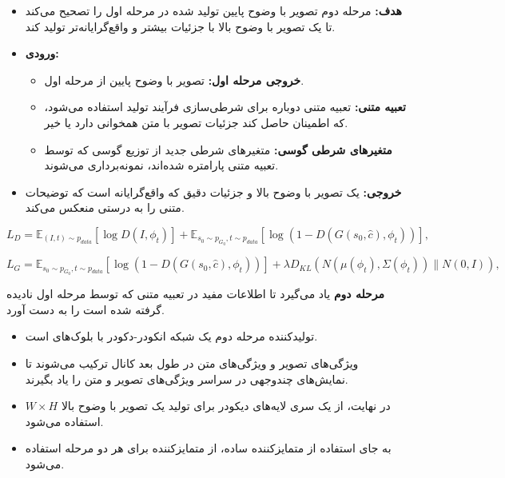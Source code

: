 \begin{enumerate}
\begin{qsolve}
\begin{enumerate}
		\begin{itemize}
			\item \textbf{هدف: }مرحله دوم  تصویر با وضوح پایین تولید شده در مرحله اول را تصحیح می‌کند تا یک تصویر  با وضوح بالا با جزئیات بیشتر و واقع‌گرایانه‌تر تولید کند.
		\end{itemize}
	\end{enumerate}
	\end{qsolve}
	
	
	\begin{qsolve}
		\begin{itemize}
			\item \textbf{ورودی: }
			\begin{itemize}
				\item \textbf{خروجی مرحله اول:} تصویر با وضوح پایین از مرحله اول.
				
				\item \textbf{تعبیه متنی: }تعبیه متنی دوباره برای شرطی‌سازی فرآیند تولید استفاده می‌شود، که اطمینان حاصل کند جزئیات تصویر با متن همخوانی دارد یا خیر.
				
				\item \textbf{متغیرهای شرطی گوسی:} متغیرهای شرطی جدید از توزیع گوسی که توسط تعبیه متنی پارامتره شده‌اند، نمونه‌برداری می‌شوند.
			\end{itemize}
			
			\item \textbf{خروجی: }یک تصویر با وضوح بالا و جزئیات دقیق که واقع‌گرایانه است که توضیحات متنی را به درستی منعکس می‌کند.
		\end{itemize}
		
		
		\begin{equation}
			L_D = \mathbb{E}_{(I,t) \sim p_{data}} [\log D(I, \phi_t)] + \mathbb{E}_{s_0 \sim p_{G_0}, t \sim p_{data}} [\log(1 - D(G(s_0, \hat{c}), \phi_t))],
		\end{equation}
		
		\begin{equation}
			L_G = \mathbb{E}_{s_0 \sim p_{G_0}, t \sim p_{data}} [\log(1 - D(G(s_0, \hat{c}), \phi_t))] + \lambda D_{KL}(N(\mu(\phi_t), \Sigma(\phi_t)) \| N(0, I)),
		\end{equation}
		
		\textbf{مرحله دوم } یاد می‌گیرد تا اطلاعات مفید در تعبیه متنی که توسط مرحله اول \textbf{} نادیده گرفته شده است را به دست آورد.
		
		\begin{itemize}
			\item تولیدکننده مرحله دوم یک شبکه انکودر-دکودر با بلوک‌های  است.
			\item ویژگی‌های تصویر و ویژگی‌های متن در طول بعد کانال ترکیب می‌شوند تا نمایش‌های چندوجهی در سراسر ویژگی‌های تصویر و متن را یاد بگیرند.
			\item در نهایت، از یک سری لایه‌های دیکودر برای تولید یک تصویر با وضوح بالا $W \times H$ استفاده می‌شود.
			\item به جای استفاده از متمایزکننده ساده، از متمایزکننده  برای هر دو مرحله استفاده می‌شود.
		\end{itemize}
		

\end{qsolve}
\end{enumerate}

